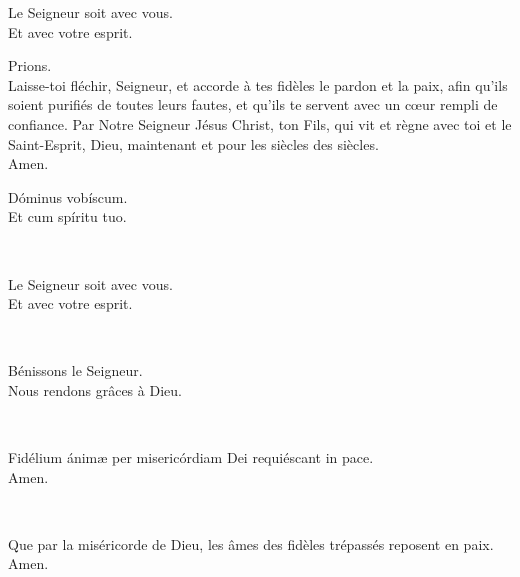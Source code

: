 \documentclass[twoside]{article}
\begin{document}
\begin{paracol}[1]{2}
\vv Le Seigneur soit avec vous. \\
\rr Et avec votre esprit.

Prions. \\
Laisse-toi fléchir, Seigneur, et accorde à tes fidèles le pardon et la paix, afin qu’ils soient purifiés de toutes leurs fautes, et qu’ils te servent avec un cœur rempli de confiance.
Par Notre Seigneur Jésus Christ, ton Fils, qui vit et règne avec toi et le Saint-Esprit, Dieu, maintenant et pour les siècles des siècles.\\
\rr Amen.

\switchcolumn*

\vv Dóminus vobíscum. \\
\rr Et cum spíritu tuo.

~~


\switchcolumn

\vv Le Seigneur soit avec vous. \\
\rr Et avec votre esprit.

~~

\vv Bénissons le Seigneur. \\
\rr Nous rendons grâces à Dieu.

\switchcolumn*

~~

\vv Fidélium ánimæ per misericórdiam Dei requiéscant in pace. \\
\rr Amen.

\switchcolumn

~~

\vv Que par la miséricorde de Dieu, les âmes des fidèles trépassés reposent en paix. \\
\rr Amen.

\end{paracol}
\end{document}
